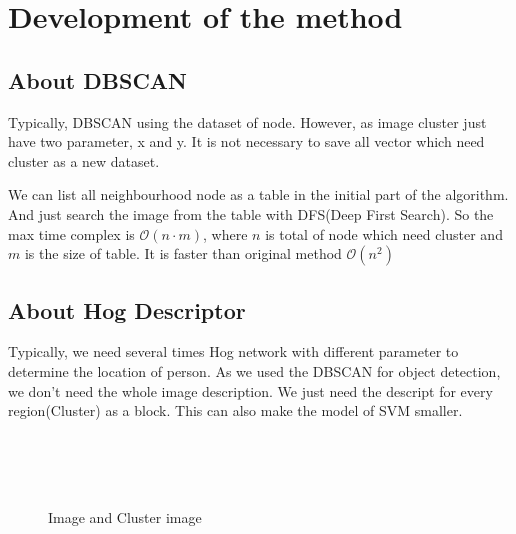 \documentclass[12pt]{article}
\theoremstyle{plain}
\begin{document}
\section{Development of the method}
\subsection{About DBSCAN}
Typically, DBSCAN using the dataset of node. However, as image cluster just have two parameter, x and y. It is not necessary to save all vector which need cluster as a new dataset.

We can list all neighbourhood node as a table in the initial part of the algorithm. And just search the image from the table with DFS(Deep First Search). So the max time complex is $\mathcal{O}{(n\cdot m)}$, where $n$ is total of node which need cluster and $m$ is the size of table. It is faster than original method $\mathcal{O}{(n^2)}$


\subsection{About Hog Descriptor}
Typically, we need several times Hog network with different parameter to determine the location of person.\cite{Lipetski2017} As we used the DBSCAN for object detection, we don't need the whole image description. We just need the descript for every region(Cluster) as a block. This can also make the model of SVM smaller.

\begin{figure}[H]
\centering
{}

\begin{multicols}{4}
\\
\\
\\
\end{multicols}

\caption{Image and Cluster image}
\end{figure}
\end{document}
